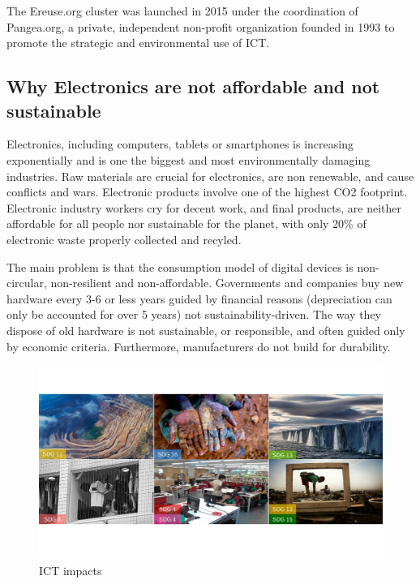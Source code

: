 \documentclass[
]{book}
\begin{document}
The Ereuse.org cluster was launched in 2015 under the coordination of Pangea.org, a private, independent non-profit organization founded in 1993 to promote the strategic and environmental use of ICT.

\hypertarget{why-electronics-are-not-affordable-and-not-sustainable}{%
\subsection{Why Electronics are not affordable and not sustainable}\label{why-electronics-are-not-affordable-and-not-sustainable}}

Electronics, including computers, tablets or smartphones is increasing exponentially and is one the biggest and most environmentally damaging industries. Raw materials are crucial for electronics, are non renewable, and cause conflicts and wars. Electronic products involve one of the highest CO2 footprint. Electronic industry workers cry for decent work, and final products, are neither affordable for all people nor sustainable for the planet, with only 20\% of electronic waste properly collected and recyled.

The main problem is that the consumption model of digital devices is non-circular, non-resilient and non-affordable. Governments and companies buy new hardware every 3-6 or less years guided by financial reasons (depreciation can only be accounted for over 5 years) not sustainability-driven. The way they dispose of old hardware is not sustainable, or responsible, and often guided only by economic criteria. Furthermore, manufacturers do not build for durability.

\begin{figure}

{\centering \includegraphics[width=1\linewidth]{./figs/25} 

}

\caption{ICT impacts}\label{fig:figimpacts}
\end{figure}
\end{document}
